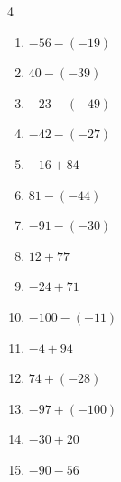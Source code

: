 \begin{multicols}{4}
\begin{enumerate}
        \phantom{$=-69$}

  \item $-56-(-19)$

        \phantom{$=-37$}

  \item $40-(-39)$

        \phantom{$=79$}

  \item $-23-(-49)$

        \phantom{$=26$}

  \item $-42-(-27)$

        \phantom{$=-15$}

  \item $-16+84$

        \phantom{$=68$}

  \item $81-(-44)$

        \phantom{$=125$}

  \item $-91-(-30)$

        \phantom{$=-61$}

  \item $12+77$

        \phantom{$=89$}

\columnbreak %

  \item $-24+71$

        \phantom{$=47$}

  \item $-100-(-11)$

        \phantom{$=-89$}

  \item $-4+94$

        \phantom{$=90$}

  \item $74+(-28)$

        \phantom{$=46$}

  \item $-97+(-100)$

        \phantom{$=-197$}

  \item $-30+20$

        \phantom{$=-10$}

  \item $-90-56$

        \phantom{$=-146$}


\end{enumerate}
\end{multicols}
